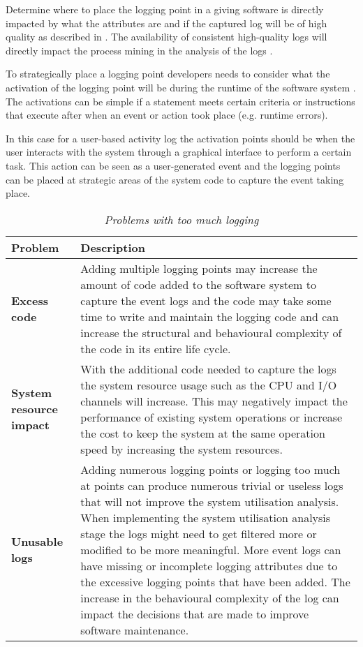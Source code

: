 Determine where to place the logging point in a giving software is directly impacted by what the attributes are and if the captured log will be of high quality as described in . The availability of consistent high-quality logs will directly impact the process mining in the analysis of the logs \cite{Kherbouche2017}.\par To strategically place a logging point developers needs to consider what the activation of the logging point will be during the runtime of the software system \cite{Pecchia2015, Cinque2013}. The activations can be simple if a statement meets certain criteria or instructions that execute after when an event or action took place (e.g. runtime errors). \par In this case for a user-based activity log the activation points should be when the user interacts with the system through a graphical interface to perform a certain task. This action can be seen as a user-generated event and the logging points can be placed at strategic areas of the system code to capture the event taking place. 

\begin{table}[!htb]
	\centering
	\caption[Problems with too much logging]
	{\textit{Problems with too much logging \cite{Zhu2015}}}
	\label{tbl:ch1_loggingTooMuch}
	\begin{tabularx}{\textwidth}{|l|X|}
		\hline \textbf{Problem}  & \textbf{Description} \\
		\hline \textbf{Excess code} & Adding multiple logging points may increase the amount of code added to the software system to capture the event logs and the code may take some time to write and maintain the logging code and can increase the structural and behavioural complexity of the code in its entire life cycle. \\
		\hline \textbf{System resource impact} & With the additional code needed to capture the logs the system resource usage such as the CPU and I/O channels will increase. This may negatively impact the performance of existing system operations or increase the cost to keep the system at the same operation speed by increasing the system resources.\\
		\hline \textbf{Unusable logs} & Adding numerous logging points or logging too much at points can produce numerous trivial or useless logs that will not improve the system utilisation analysis. When implementing the system utilisation analysis stage the logs might need to get filtered more or modified to be more meaningful. More event logs can have missing or incomplete logging attributes due to the excessive logging points that have been added. The increase in the behavioural complexity of the log can impact the decisions that are made to improve software maintenance. \\
		\hline
	\end{tabularx}
\end{table}


